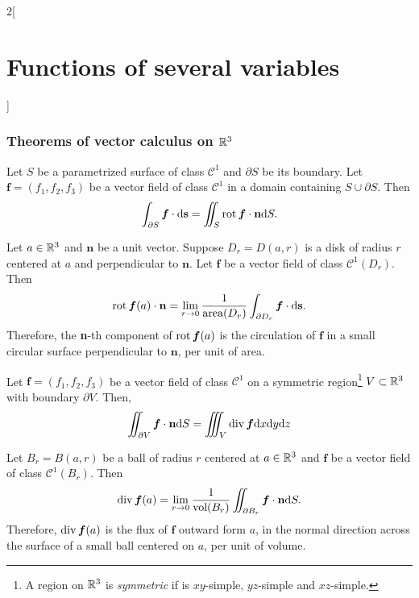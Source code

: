 \documentclass[../../../main.tex]{subfiles}
\begin{document}
\begin{multicols}{2}[\section{Functions of several variables}]
\subsubsection*{Theorems of vector calculus on \texorpdfstring{$\mathbb{R}^3$}{R3}}
\begin{theorem}
Let $S$ be a parametrized surface of class $\mathcal{C}^1$ and $\partial S$ be its boundary. Let $\boldsymbol{f}=(f_1,f_2,f_3)$ be a vector field of class $\mathcal{C}^1$ in a domain containing $S\cup\partial S$. Then $$\int_{\partial S}\boldsymbol{f}\cdot \dd \textbf{s}=\iint_S\operatorname{rot}\boldsymbol{f}\cdot\textbf{n} \dd S.$$
\end{theorem}
\begin{corollary}
Let $a\in\mathbb{R}^3$ and $\textbf{n}$ be a unit vector. Suppose $D_r=D(a,r)$ is a disk of radius $r$ centered at $a$ and perpendicular to $\textbf{n}$. Let $\boldsymbol{f}$ be a vector field of class $\mathcal{C}^1(D_r)$. Then $$\operatorname{rot}\boldsymbol{f}(a)\cdot\textbf{n}=\lim_{r\to 0}\frac{1}{\text{area}(D_r)}\int_{\partial D_r}\boldsymbol{f}\cdot \dd \textbf{s}.$$ Therefore, the \textbf{n}-th component of $\operatorname{rot}\boldsymbol{f}(a)$ is the circulation of $\boldsymbol{f}$ in a small circular surface perpendicular to $\textbf{n}$, per unit of area.
\end{corollary}
\begin{theorem}
Let $\boldsymbol{f}=(f_1,f_2,f_3)$ be a vector field of class $\mathcal{C}^1$ on a symmetric region\footnote{A region on $\mathbb{R}^3$ is \textit{symmetric} if is $xy$-simple, $yz$-simple and $xz$-simple.} $V\subset\mathbb{R}^3$ with boundary $\partial V$. Then, $$\iint_{\partial V}\boldsymbol{f}\cdot\textbf{n} \dd S=\iiint_V\operatorname{div}\boldsymbol{f}\dd x\dd y\dd z$$
\end{theorem}\pagebreak
\begin{corollary}
Let $B_r=B(a,r)$ be a ball of radius $r$ centered at $a\in\mathbb{R}^3$ and $\boldsymbol{f}$ be a vector field of class $\mathcal{C}^1(B_r)$. Then $$\operatorname{div}\boldsymbol{f}(a)=\lim_{r\to 0}\frac{1}{\text{vol}(B_r)}\iint_{\partial B_r}\boldsymbol{f}\cdot\textbf{n} \dd S.$$ Therefore, $\operatorname{div}\boldsymbol{f}(a)$ is the flux of $\boldsymbol{f}$ outward form $a$, in the normal direction across the surface of a small ball centered on $a$, per unit of volume.
\end{corollary}
\end{multicols}
\end{document}

